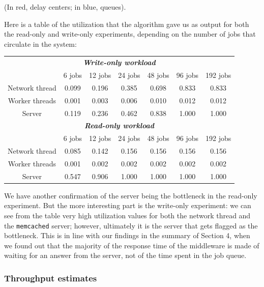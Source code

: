 \documentclass[11pt,a4paper]{article}
\renewcommand{\t}[1]{%
	{\texttt{#1}}}
\begin{document}
(In red, delay centers; in blue, queues).

Here is a table of the utilization that the algorithm gave us as output 
for both the read-only and write-only experiments, depending on the 
number of jobs that circulate in the system:

\begin{table}[H]
\centering
\begin{tabular}{@{}ccccccc@{}}
\toprule
\multicolumn{7}{c}{\textit{\textbf{Write-only workload}}} \\ 
 & 6 jobs & 12 jobs & 24 jobs & 48 jobs & 96 jobs & 192 jobs \\ \midrule
\multicolumn{1}{c|}{Network thread} & 0.099 & 0.196 & 0.385 & 0.698 & 0.833 & 0.833 \\
\multicolumn{1}{c|}{Worker threads} & 0.001 & 0.003 & 0.006 & 0.010 & 0.012 & 0.012 \\
\multicolumn{1}{c|}{Server} & 0.119 & 0.236 & 0.462 & 0.838 & 1.000 & 1.000 \\ \midrule
\multicolumn{7}{c}{\textit{\textbf{Read-only workload}}} \\ 
 & 6 jobs & 12 jobs & 24 jobs & 48 jobs & 96 jobs & 192 jobs \\ \midrule
\multicolumn{1}{c|}{Network thread} & 0.085 & 0.142 & 0.156 & 0.156 & 0.156 & 0.156 \\
\multicolumn{1}{c|}{Worker threads} & 0.001 & 0.002 & 0.002 & 0.002 & 0.002 & 0.002 \\
\multicolumn{1}{c|}{Server} & 0.547 & 0.906 & 1.000 & 1.000 & 1.000 & 1.000 \\ \bottomrule
\end{tabular}
\end{table}

We have another confirmation of the server being the bottleneck in the read-only experiment.
But the more interesting part is the write-only experiment: we can see from the table very high
utilization values for both the network thread and the \t{memcached} server; however, ultimately
it is the server that gets flagged as the bottleneck. This is in line with our findings in the
summary of Section 4, when we found out that the majority of the response time of the middleware
is made of waiting for an answer from the server, not of the time spent in the job queue.


\subsubsection{Throughput estimates}
\end{document}
